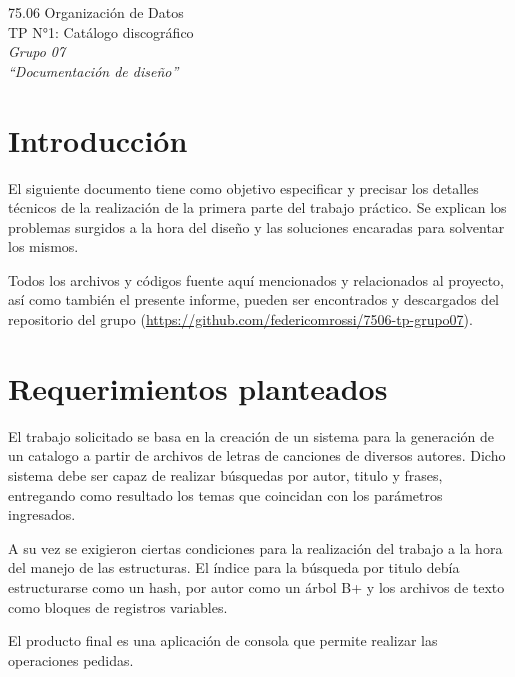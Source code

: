 \documentclass{article}
\begin{document}
\begin{titlepage}
	\vspace*{\fill}
	\begin{center}
		\Large 75.06 Organización de Datos \\
		\Huge TP N°1: Catálogo discográfico \\
		\bigskip\huge\textit{Grupo 07} \\
		\bigskip\bigskip\bigskip\bigskip\bigskip\bigskip
		\bigskip\bigskip\bigskip\bigskip\bigskip\bigskip\bigskip
		\medskip\huge\textit{``Documentación de diseño''} \\
		\date{}
	\end{center}
	\vspace*{\fill}
\end{titlepage}
\newpage



\tableofcontents
\newpage


\section{Introducción}
	
	El siguiente documento tiene como objetivo especificar y precisar los detalles técnicos de la realización de la primera parte del trabajo práctico. Se explican los problemas surgidos a la hora del diseño y las soluciones encaradas para solventar los mismos.
	\par
	Todos los archivos y códigos fuente aquí mencionados y relacionados al proyecto, así como también el presente informe, pueden ser encontrados y descargados del repositorio del grupo (\url{https://github.com/federicomrossi/7506-tp-grupo07}).
\bigskip




\section{Requerimientos planteados}

	El trabajo solicitado se basa en la creación de un sistema para la generación de un catalogo a partir de archivos de letras de canciones de diversos autores. Dicho sistema debe ser capaz de realizar búsquedas por autor, titulo y frases, entregando como resultado los temas que coincidan con los parámetros ingresados.
	\par
	A su vez se exigieron ciertas condiciones para la realización del trabajo a la hora del manejo de las estructuras. El índice para la búsqueda por titulo debía estructurarse como un hash, por autor como un árbol B+ y los archivos de texto como bloques de registros variables.
	\par
	El producto final es una aplicación de consola que permite realizar las operaciones pedidas.
\end{document}
